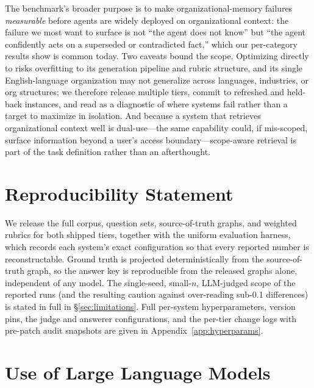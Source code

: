 The benchmark's broader purpose is to make organizational-memory failures
\emph{measurable} before agents are widely deployed on organizational context:
the failure we most want to surface is not ``the agent does not know'' but ``the
agent confidently acts on a superseded or contradicted fact,'' which our
per-category results show is common today. Two caveats bound the scope.
Optimizing directly to \bench{} risks overfitting to its generation pipeline and
rubric structure, and its single English-language organization may not generalize
across languages, industries, or org structures; we therefore release multiple
tiers, commit to refreshed and held-back instances, and read \bench{} as a
diagnostic of where systems fail rather than a target to maximize in isolation.
And because a system that retrieves organizational context well is dual-use---the
same capability could, if mis-scoped, surface information beyond a user's access
boundary---scope-aware retrieval is part of the task definition rather than an
afterthought.

\section*{Reproducibility Statement}
\label{sec:reproducibility}

We release the full \bench{} corpus, question sets, source-of-truth graphs, and
weighted rubrics for both shipped tiers, together with the uniform evaluation
harness, which records each system's exact configuration so that every reported
number is reconstructable. Ground truth is projected deterministically from the
source-of-truth graph, so the answer key is reproducible from the released graphs
alone, independent of any model. The single-seed, small-$n$, LLM-judged scope of
the reported runs (and the resulting caution against over-reading sub-0.1
differences) is stated in full in \S\ref{sec:limitations}. Full per-system
hyperparameters, version pins, the judge and answerer configurations, and the
per-tier change logs with pre-patch audit snapshots are given in
Appendix~\ref{app:hyperparams}.

\section*{Use of Large Language Models}
\label{sec:llm-use}


